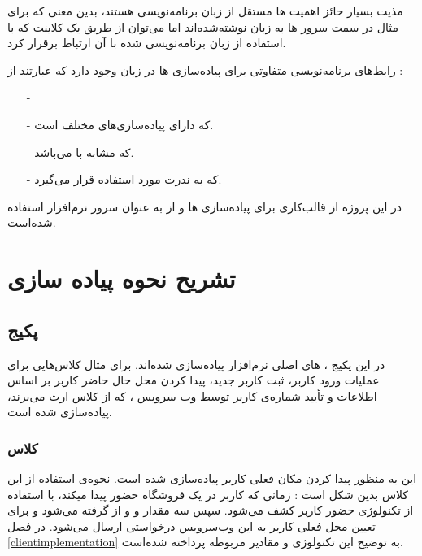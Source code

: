 \documentclass[oneside]{report}
\begin{document}
مذیت بسیار حائز اهمیت 
{\normalsize{}} ها 
مستقل از زبان برنامه‌نویسی
 هستند، بدین معنی که برای مثال در سمت سرور 
{\normalsize{}} ها 
به زبان 
{\normalsize{}}
نوشته‌‌شده‌اند اما می‌توان از طریق یک کلاینت که با استفاده از زبان 
{\normalsize{}}
برنامه‌نویسی شده با آن ارتباط برقرار کرد. 

رابط‌های برنامه‌نویسی متفاوتی برای پیاده‌سازی 
{\normalsize{}} ها 
در زبان 
{\normalsize{}}
وجود دارد که عبارتند از : 

\begin{itemize}
	\item [-]{\normalsize{}}
	\item [-]{\normalsize{}}
	که دارای پیاده‌سازی‌های مختلف است.
	\item [-]{\normalsize{}}
	که مشابه با 
	{\normalsize{}}
	می‌باشد.
	\item [-]{\normalsize{}} 
	که به ندرت مورد استفاده قرار می‌گیرد.
\end{itemize}

\cite{webserviceoreilly}

در این پروژه از قالب‌کاری 
{\normalsize{}}
برای پیاده‌سازی 
{\normalsize{}} ها 
و از 
{\normalsize{}}
به عنوان سرور نرم‌افزار
استفاده شده‌است.

\section{تشریح نحوه پیاده سازی}
	\subsection{پکیج {\small{}}}
	در این پکیج 
،
{\normalsize{}} های 
اصلی نرم‌افزار پیاده‌سازی شده‌اند. برای مثال کلاس‌هایی برای عملیات ورود کاربر، ثبت کاربر جدید، پیدا کردن محل حال حاضر کاربر بر اساس اطلاعات 
{\normalsize{}}
و تأیید شماره‌ی کاربر توسط وب سرویس 
{\normalsize{}}
، که از کلاس
{\normalsize{}}
ارث می‌برند، پیاده‌سازی شده است. 

\subsubsection{کلاس{\small{}}}
این 
{\normalsize{}}
 به منظور پیدا کردن مکان فعلی کاربر پیاده‌سازی شده است. نحوه‌ی استفاده از این کلاس بدین شکل است : زمانی که کاربر در یک فروشگاه حضور پیدا میکند، با استفاده از تکنولوژی 
 {\normalsize{}}
 حضور کاربر کشف می‌شود. سپس سه مقدار 
 {\normalsize{}}
 و 
 {\normalsize{}}
 و 
 {\normalsize{}}
 از 
 {\normalsize{}}
 گرفته می‌شود و برای تعیین محل فعلی کاربر به این وب‌سرویس درخواستی ارسال می‌شود. در فصل 
 \ref{clientimplementation}
 به توضیح این تکنولوژی و مقادیر مربوطه پرداخته شده‌است. 
 
\end{document}
